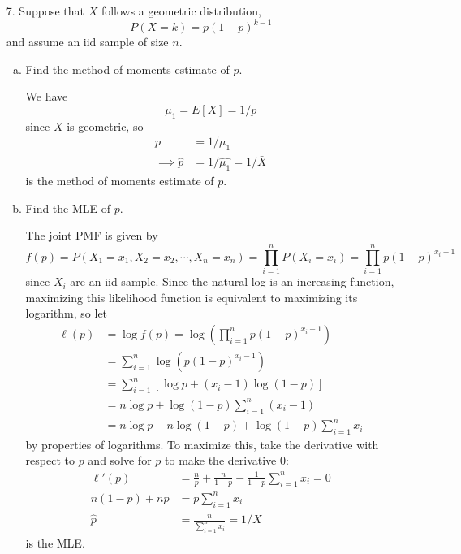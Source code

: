 \documentclass{article}
\begin{document}
\begin{itemize}
		\newpage
	\item[7.] Suppose that $X$ follows a geometric distribution, \[P(X=k)=p(1-p)^{k-1}\] and assume an iid sample of size $n.$
		\begin{enumerate}[(a)]
			\item Find the method of moments estimate of $p.$

				\begin{soln}
					We have \[\mu_1=E[X]=1/p\] since $X$ is geometric, so 
					\begin{align*}
						p &= 1/\mu_1 \\
						\implies \hat{p}&=1/\hat{\mu_1}=1/\bar{X}
					\end{align*} is the method of moments estimate of $p.$

				\end{soln}
			\item Find the MLE of $p.$
				\begin{soln}
					The joint PMF is given by \[f(p)=P(X_1=x_1, X_2=x_2,\cdots, X_n=x_n)=\prod_{i=1}^n P(X_i=x_i)=\prod_{i=1}^n p(1-p)^{x_i-1}\] since $X_i$ are an iid sample. Since the natural log is an increasing function, maximizing this likelihood function is equivalent to maximizing its logarithm, so let
					\begin{align*}
						\ell(p) &=\log f(p)=\log\left( \prod_{i=1}^n p(1-p)^{x_i-1} \right)\\
						&= \sum_{i=1}^{n}\log\left( p(1-p)^{x_i-1} \right) \\
						&= \sum_{i=1}^{n}\left[ \log p + (x_i-1)\log(1-p) \right] \\
						&= n\log p + \log(1-p)\sum_{i=1}^{n}(x_i-1) \\
						&= n\log p - n\log(1-p) + \log(1-p)\sum_{i=1}^{n} x_i
					\end{align*} by properties of logarithms. To maximize this, take the derivative with respect to $p$ and solve for $p$ to make the derivative 0:
					\begin{align*}
						\ell'(p) &= \frac{n}{p}+\frac{n}{1-p}-\frac{1}{1-p}\sum_{i=1}^{n}x_i = 0 \\
						n(1-p) + np &= p\sum_{i=1}^{n} x_i \\
						\hat{p} &= \frac{n}{\sum_{i=1}^{n}x_i} = \boxed{1/\bar{X}}
					\end{align*} is the MLE.
				\end{soln}


\end{enumerate}
\end{itemize}
\end{document}
